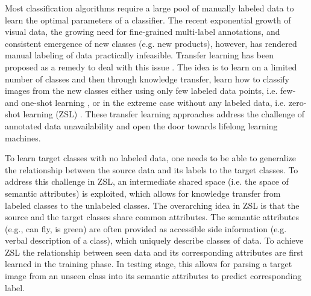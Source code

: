 \documentclass[letterpaper]{article} %
\begin{document}
Most classification algorithms require a large pool of manually labeled data to learn the optimal parameters of a classifier. The recent exponential growth of visual data, the growing need for fine-grained multi-label annotations, and consistent emergence of new classes (e.g. new products), however, has rendered manual labeling of data practically infeasible. Transfer learning has been proposed as a remedy to deal with this issue \cite{lampert2014attribute}. The idea is to learn on a limited number of classes and then through knowledge transfer, learn how to classify images from the new classes either using only few labeled data points, i.e. few- and one-shot learning \cite{fei2006one}, or in the extreme case without any labeled data, i.e. zero-shot learning (ZSL) \cite{lampert2014attribute}.  These transfer learning approaches  address the challenge of annotated data unavailability and open the door towards lifelong learning machines. %


To learn target classes with no labeled data, one needs to be able to generalize the relationship between the source data and its labels to the target classes.  To address this challenge in ZSL, an intermediate shared space (i.e. the space of semantic attributes) is exploited, which allows for knowledge transfer from labeled classes to the unlabeled classes. 
The overarching idea in ZSL is that the source and the target classes share common  attributes. The semantic attributes (e.g., can fly, is green) are often provided as accessible side information (e.g. verbal description of a class), which uniquely describe classes of data. To achieve ZSL the relationship between  seen data and its corresponding attributes are first learned in the training phase. In testing stage, this allows for parsing a target image from an unseen class into its semantic attributes to predict  corresponding label.
\end{document}
